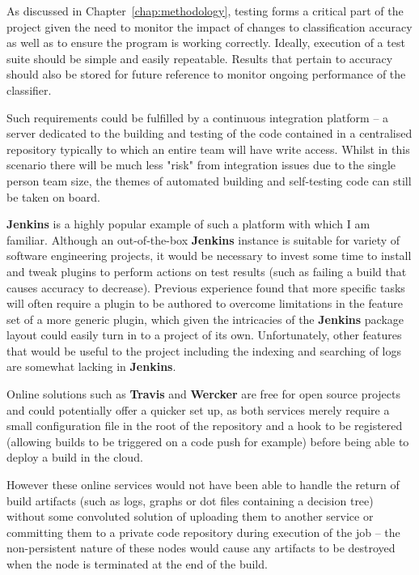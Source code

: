 As discussed in Chapter~\ref{chap:methodology}, testing forms a critical part of
the project given the need to monitor the impact of changes to classification
accuracy as well as to ensure the program is working correctly. Ideally,
execution of a test suite should be simple and easily repeatable. Results that
pertain to accuracy should also be stored for future reference to monitor
ongoing performance of the classifier.

Such requirements could be fulfilled by a continuous integration platform -- a
server dedicated to the building and testing of the code contained in a
centralised repository typically to which an entire team will have write
access\citep{fowler-ci}. Whilst in this scenario there will be much less "risk"
from integration issues due to the single person team size, the themes of
automated building and self-testing code can still be taken on board.

\textbf{Jenkins}\citep{Jenkins} is a highly popular\cite{jenkins-stats} example
of such a platform with which I am familiar. Although an out-of-the-box
\textbf{Jenkins} instance is suitable for variety of software engineering
projects, it would be necessary to invest some time to install and tweak plugins
to perform actions on test results (such as failing a build that causes accuracy
to decrease).  Previous experience found that more specific tasks will often
require a plugin to be authored to overcome limitations in the feature set of a
more generic plugin, which given the intricacies of the \textbf{Jenkins} package
layout could easily turn in to a project of its own. Unfortunately, other
features that would be useful to the project including the indexing and
searching of logs are somewhat lacking in \textbf{Jenkins}.

Online solutions such as \textbf{Travis}\citep{travis-ci} and
\textbf{Wercker}\citep{wercker} are free for open source projects and could
potentially offer a quicker set up, as both services merely require a small
configuration file in the root of the repository and a hook to be registered
(allowing builds to be triggered on a code push for example) before being able
to deploy a build in the cloud.

However these online services would not have been able to handle the return of
build artifacts (such as logs, graphs or dot files containing a decision tree)
without some convoluted solution of uploading them to another service or
committing them to a private code repository during execution of the job -- the
non-persistent nature of these nodes would cause any artifacts to be destroyed
when the node is terminated at the end of the build.

